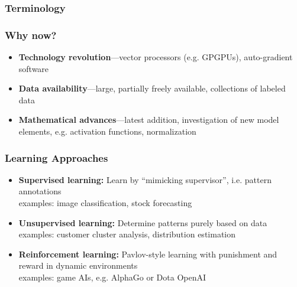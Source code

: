 \documentclass[aspectratio=169]{beamer}
\begin{document}
\begin{frame}
    \frametitle{Terminology}
    
    \begin{figure}
        \centering
    \end{figure}
\end{frame}

\begin{frame}
\frametitle{Why now?}
    \begin{itemize}
        \item \textbf{Technology revolution}---vector processors (e.g. GPGPUs), auto-gradient software
        \item \textbf{Data availability}---large, partially freely available, collections of labeled data
        \item \textbf{Mathematical advances}---latest addition, investigation of new model elements, e.g. activation functions, normalization
    \end{itemize}
\end{frame}

\begin{frame}
\frametitle{Learning Approaches}
    \begin{itemize}
        \item \textbf{Supervised learning:} Learn by ``mimicking supervisor'', i.e. pattern annotations\\ 
        examples: image classification, stock forecasting
        \item \textbf{Unsupervised learning:} Determine patterns purely based on data\\ examples: customer cluster analysis, distribution estimation
        \item \textbf{Reinforcement learning:} Pavlov-style learning with punishment and reward in dynamic environments\\
        examples: game AIs, e.g. AlphaGo or Dota OpenAI
    \end{itemize}
\end{frame}
\end{document}
